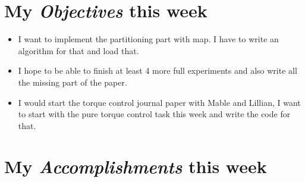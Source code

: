 \newcommand{\handoutName}{Weekly report}
\newcommand{\handoutdate}{\today}


\section{My \emph{Objectives} this week}
\begin{itemize}
\item I want to implement the partitioning part with map. I have to write an algorithm for that and load that.
\item I hope to be able to finish at least 4 more full experiments and also write all the missing part of the paper.
\item I would start the torque control journal paper with Mable and Lillian, I want to start with the pure torque control task this week and write the code for that.
\end{itemize}



\section{My \emph{Accomplishments} this week}


